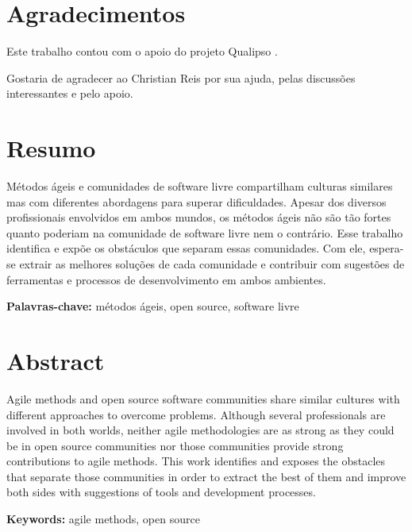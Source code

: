 \documentclass[12pt,twoside,letterpaper]{book}
\begin{document}

\chapter*{Agradecimentos}

Este trabalho contou com o apoio do projeto Qualipso \cite{Qualipso}.

Gostaria de agradecer ao Christian Reis por sua ajuda, pelas
discussões interessantes e pelo apoio.

\chapter*{Resumo}

Métodos ágeis e comunidades de software livre compartilham culturas
similares mas com diferentes abordagens para superar
dificuldades. Apesar dos diversos profissionais envolvidos em ambos
mundos, os métodos ágeis não são tão fortes quanto poderiam na
comunidade de software livre nem o contrário. Esse trabalho identifica
e expõe os obstáculos que separam essas comunidades. Com ele,
espera-se extrair as melhores soluções de cada comunidade e contribuir
com sugestões de ferramentas e processos de desenvolvimento em ambos
ambientes.

\noindent \textbf{Palavras-chave:} métodos ágeis, open source,
software livre

\chapter*{Abstract}

Agile methods and open source software communities share similar
cultures with different approaches to overcome problems. Although
several professionals are involved in both worlds, neither agile
methodologies are as strong as they could be in open source
communities nor those communities provide strong contributions to
agile methods. This work identifies and exposes the obstacles that
separate those communities in order to extract the best of them and
improve both sides with suggestions of tools and development
processes.

\noindent \textbf{Keywords:} agile methods, open source
\end{document}
